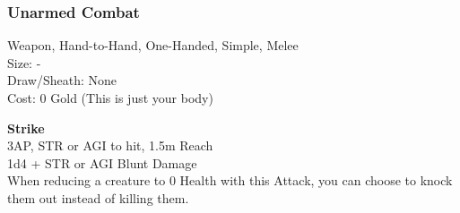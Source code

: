 \subsubsection{Unarmed Combat}\label{weapon:unarmedCombat}
Weapon, Hand-to-Hand, One-Handed, Simple, Melee\\
Size: -\\
Draw/Sheath: None\\
Cost: 0 Gold (This is just your body)

\textbf{Strike}\\
3AP, STR or AGI to hit, 1.5m Reach\\
1d4 +  STR or AGI Blunt Damage\\
When reducing a creature to 0 Health with this Attack, you can choose to knock them out instead of killing them.
